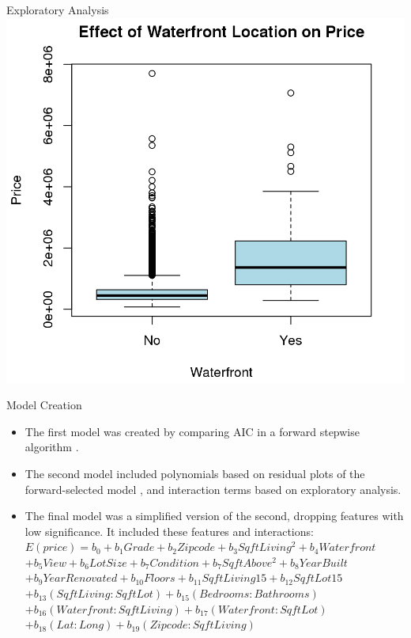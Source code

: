 \documentclass[final]{beamer}
\begin{document}
\begin{frame}[fragile]
\begin{columns}[t]
\begin{column}{0.31\linewidth}
\begin{minipage}[t][.955\textheight]{\linewidth}
\begin{block}{Exploratory Analysis}
\centering
\includegraphics{waterfront.png}
\vspace{0ex}
\end{block}
\vfill

\begin{block}{Model Creation}
\begin{itemize}
\item The first model was created by comparing AIC in a forward stepwise algorithm \cite{R-MASS}.
\item The second model included polynomials based on residual plots of the forward-selected model \cite{R-car}, and interaction terms based on exploratory analysis.
\item The final model was a simplified version of the second, dropping features with low significance. It included these features and interactions: $E(price) = b_0 + b_1 Grade + b_2 Zipcode + b_3 SqftLiving^2 + b_4 Waterfront$
$+ b_5 View + b_6 LotSize + b_7 Condition + b_7 SqftAbove^2 + b_8 YearBuilt$
$+ b_9 YearRenovated + b_10 Floors + b_11 SqftLiving15 + b_12 SqftLot15$
$+ b_13 (SqftLiving:SqftLot) + b_15 (Bedrooms:Bathrooms)$
$+ b_16 (Waterfront:SqftLiving) + b_17 (Waterfront:SqftLot)$
$+ b_18 (Lat:Long) + b_19 (Zipcode:SqftLiving)$
\end{itemize}
\vspace{0ex}
\end{block}
\vfill


\end{minipage}
\end{column}
\end{columns}
\end{frame}
\end{document}
